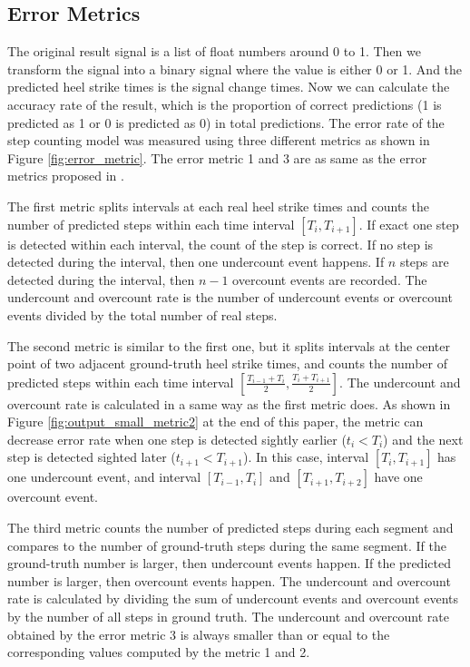 \documentclass[11pt]{article}
\begin{document}
\subsection{Error Metrics}

The original result signal is a list of float numbers around 0 to 1. Then we transform the signal into a binary signal where the value is either 0 or 1. And the predicted heel strike times is the signal change times. Now we can calculate the accuracy rate of the result, which is the proportion of correct predictions (1 is predicted as 1 or 0 is predicted as 0) in total predictions. The error rate of the step counting model was measured using three different metrics as shown in Figure \ref{fig:error_metric}. The error metric 1 and 3 are as same as the error metrics proposed in \cite{flores2016weallwalk}.

The first metric splits intervals at each real heel strike times and counts the number of predicted steps within each time interval $[T_i, T_{i+1}]$.  If exact one step is detected within each interval, the count of the step is correct. If no step is detected during the interval, then one undercount event happens. If $n$ steps are detected during the interval, then $n-1$ overcount events are recorded. The undercount and overcount rate is the number of undercount events or overcount events divided by the total number of real steps.

The second metric is similar to the first one,  but it  splits intervals at the center point of two adjacent ground-truth heel strike times, and counts the number of predicted steps within each time interval $[\frac{T_{i-1}+T_i}{2}, \frac{T_i+T_{i+1}}{2}]$. The undercount and overcount rate is calculated in a same way as the first metric does. As shown in Figure \ref{fig:output_small_metric2} at the end of this paper,  the metric can decrease error rate when one step is detected sightly earlier ($t_i<T_i$) and the next step is detected sighted later ($t_{i+1}<T_{i+1}$). In this case, interval $[T_i, T_{i+1}]$ has one undercount event, and interval $[T_{i-1}, T_i]$ and $[T_{i+1}, T_{i+2}]$ have one overcount event.

The third metric counts the number of predicted steps during each segment and compares to the number of ground-truth steps during the same segment. If the ground-truth number is larger, then undercount events happen. If the predicted number is larger, then overcount events happen. The undercount and overcount rate is calculated by dividing the sum of undercount events and overcount events by the number of all steps in ground truth. The undercount and overcount rate obtained by the error metric 3 is always smaller than or equal to the corresponding values computed by the metric 1 and 2.
\end{document}
